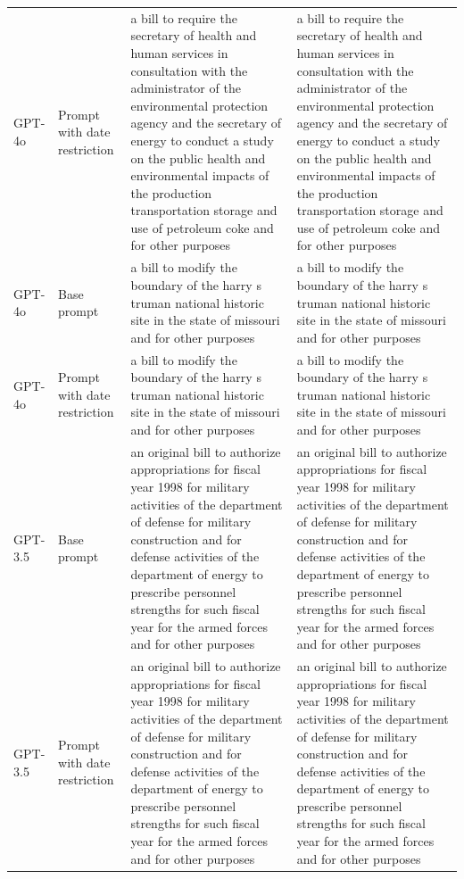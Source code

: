 \begin{longtable}{>{\raggedright\arraybackslash}p{1.4cm}>{\raggedright\arraybackslash}p{1.4cm}>{\raggedright\arraybackslash}p{5.5cm}>{\raggedright\arraybackslash}p{5.5cm}}
GPT-4o & Prompt with date restriction & a bill to require the secretary of health and human services in consultation with the administrator of the environmental protection agency and the secretary of energy to conduct a study on the public health and environmental impacts of the production transportation storage and use of petroleum coke and for other purposes & a bill to require the secretary of health and human services in consultation with the administrator of the environmental protection agency and the secretary of energy to conduct a study on the public health and environmental impacts of the production transportation storage and use of petroleum coke and for other purposes\\
GPT-4o & Base prompt & a bill to modify the boundary of the harry s truman national historic site in the state of missouri and for other purposes & a bill to modify the boundary of the harry s truman national historic site in the state of missouri and for other purposes\\
GPT-4o & Prompt with date restriction & a bill to modify the boundary of the harry s truman national historic site in the state of missouri and for other purposes & a bill to modify the boundary of the harry s truman national historic site in the state of missouri and for other purposes\\
GPT-3.5 & Base prompt & an original bill to authorize appropriations for fiscal year 1998 for military activities of the department of defense for military construction and for defense activities of the department of energy to prescribe personnel strengths for such fiscal year for the armed forces and for other purposes & an original bill to authorize appropriations for fiscal year 1998 for military activities of the department of defense for military construction and for defense activities of the department of energy to prescribe personnel strengths for such fiscal year for the armed forces and for other purposes\\
GPT-3.5 & Prompt with date restriction & an original bill to authorize appropriations for fiscal year 1998 for military activities of the department of defense for military construction and for defense activities of the department of energy to prescribe personnel strengths for such fiscal year for the armed forces and for other purposes & an original bill to authorize appropriations for fiscal year 1998 for military activities of the department of defense for military construction and for defense activities of the department of energy to prescribe personnel strengths for such fiscal year for the armed forces and for other purposes\\

\end{longtable}
